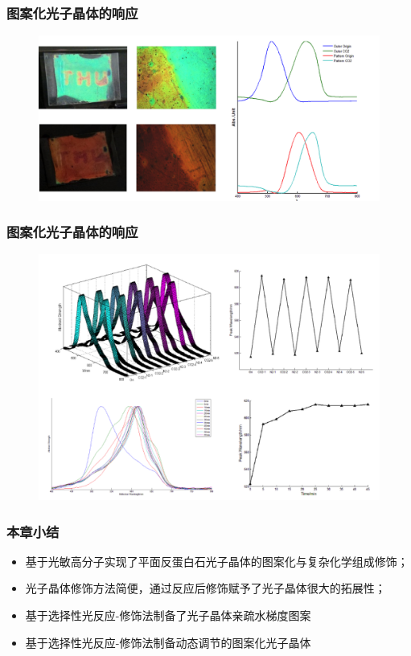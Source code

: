 \documentclass{beamer}
\begin{document}
\begin{frame}
  \frametitle{图案化光子晶体的响应}
  \begin{figure}
  \centering
  \includegraphics[width=\linewidth]{figures/patternPhC-response.png}
  \end{figure}
\end{frame}

\begin{frame}
  \frametitle{图案化光子晶体的响应}
  \begin{figure}
  \centering
  \includegraphics[width=0.85\linewidth]{figures/charach-pattern.png}
  \end{figure}
\end{frame}

\begin{frame}
  \frametitle{本章小结}
  \begin{itemize}[<+-| alert@+>]
    \item
    基于光敏高分子实现了平面反蛋白石光子晶体的图案化与复杂化学组成修饰；
    \item
    光子晶体修饰方法简便，通过反应后修饰赋予了光子晶体很大的拓展性；
    \item
    基于选择性光反应-修饰法制备了光子晶体亲疏水梯度图案
    \item
    基于选择性光反应-修饰法制备动态调节的图案化光子晶体
  \end{itemize}
\end{frame}
\end{document}
